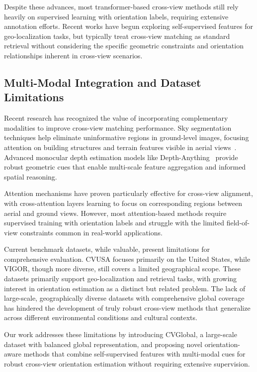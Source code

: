 \documentclass{bmvc2k}
\begin{document}
Despite these advances, most transformer-based cross-view methods still rely heavily on supervised learning with orientation labels, requiring extensive annotation efforts. Recent works have begun exploring self-supervised features for geo-localization tasks, but typically treat cross-view matching as standard retrieval without considering the specific geometric constraints and orientation relationships inherent in cross-view scenarios.

\subsection{Multi-Modal Integration and Dataset Limitations}

Recent research has recognized the value of incorporating complementary modalities to improve cross-view matching performance. Sky segmentation techniques help eliminate uninformative regions in ground-level images, focusing attention on building structures and terrain features visible in aerial views~\cite{workman2015predicting}. Advanced monocular depth estimation models like Depth-Anything~\cite{yang2024depth} provide robust geometric cues that enable multi-scale feature aggregation and informed spatial reasoning.

Attention mechanisms have proven particularly effective for cross-view alignment, with cross-attention layers learning to focus on corresponding regions between aerial and ground views. However, most attention-based methods require supervised training with orientation labels and struggle with the limited field-of-view constraints common in real-world applications.

Current benchmark datasets, while valuable, present limitations for comprehensive evaluation. CVUSA focuses primarily on the United States, while VIGOR, though more diverse, still covers a limited geographical scope. These datasets primarily support geo-localization and retrieval tasks, with growing interest in orientation estimation as a distinct but related problem. The lack of large-scale, geographically diverse datasets with comprehensive global coverage has hindered the development of truly robust cross-view methods that generalize across different environmental conditions and cultural contexts.

Our work addresses these limitations by introducing CVGlobal, a large-scale dataset with balanced global representation, and proposing novel orientation-aware methods that combine self-supervised features with multi-modal cues for robust cross-view orientation estimation without requiring extensive supervision.
\end{document}
